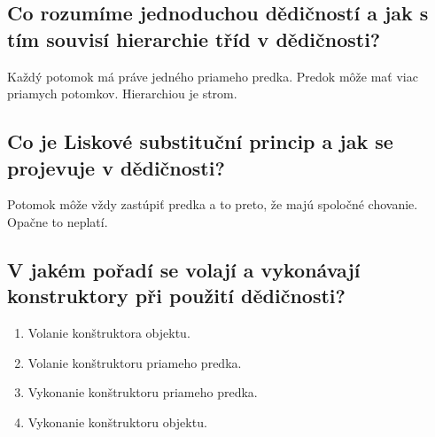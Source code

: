 \subsection{Co rozumíme jednoduchou dědičností a jak s tím souvisí hierarchie tříd v dědičnosti?}
Každý potomok má práve jedného priameho predka. Predok môže mať viac priamych potomkov. Hierarchiou je strom.

\subsection{Co je Liskové substituční princip a jak se projevuje v dědičnosti?}
Potomok môže vždy zastúpiť predka a to preto, že majú spoločné chovanie. Opačne to neplatí.

\subsection{V jakém pořadí se volají a vykonávají konstruktory při použití dědičnosti?}
\begin{enumerate}
    \item Volanie konštruktora objektu.
    \item Volanie konštruktoru priameho predka.
    \item Vykonanie konštruktoru priameho predka.
    \item Vykonanie konštruktoru objektu.
\end{enumerate}